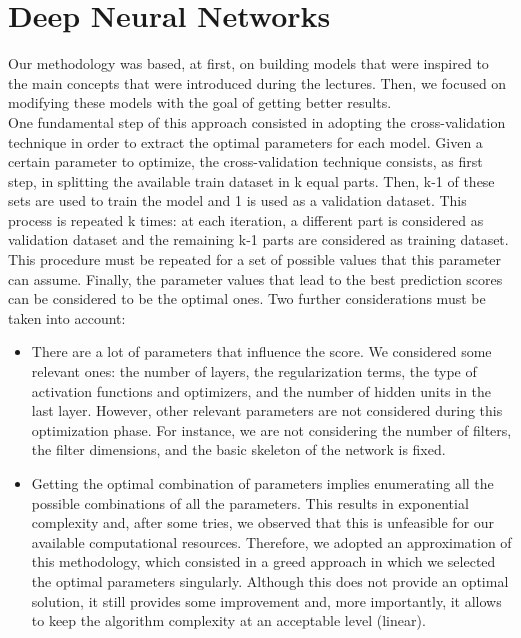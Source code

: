 \documentclass[10pt,conference,compsocconf]{IEEEtran}
\begin{document}
\section{Deep Neural Networks}
\label{sec:deep}
Our methodology was based, at first, on building models that were inspired to the main concepts that were introduced during the lectures. Then, we focused on modifying these models with the goal of getting better results.\\
One fundamental step of this approach consisted in adopting the cross-validation technique in order to extract the optimal parameters for each model. Given a certain parameter to optimize, the cross-validation technique consists, as first step, in splitting the available train dataset in k equal parts. Then, k-1 of these sets are used to train the model and 1 is used as a validation dataset. This process is repeated k times: at each iteration, a different part is considered as validation dataset and the remaining k-1 parts are considered as training dataset. This procedure must be repeated for a set of possible values that this parameter can assume. Finally, the parameter values that lead to the best prediction scores can be considered to be the optimal ones.
Two further considerations must be taken into account:\\
\begin{itemize}
	\item  There are a lot of parameters that influence the score. We considered some relevant ones: the number of layers, the regularization terms, the type of activation functions and optimizers, and the number of hidden units in the last layer. However, other relevant parameters are not considered during this optimization phase. For instance, we are not considering the number of filters, the filter dimensions, and the basic skeleton of the network is fixed.
	\item Getting the optimal combination of parameters implies enumerating all the possible combinations of all the parameters. This results in exponential complexity and, after some tries, we observed that this is unfeasible for our available computational resources. Therefore, we adopted an approximation of this methodology, which consisted in a greed approach in which we selected the optimal parameters singularly. Although this does not provide an optimal solution, it still provides some improvement and, more importantly, it allows to keep the algorithm complexity at an acceptable level (linear).
\end{itemize}
\end{document}

